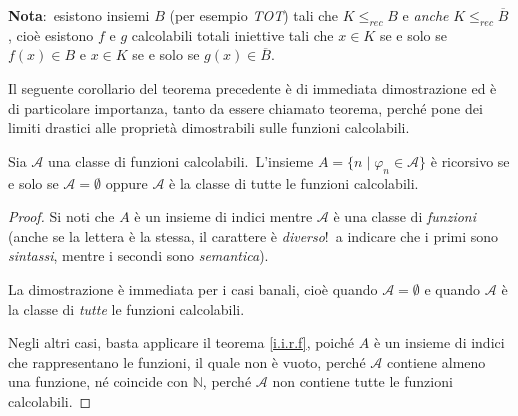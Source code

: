 \noindent\textbf{Nota}:\ esistono insiemi $B$ (per esempio \textit{\footnotesize TOT}) tali che $K \leqslant_{rec} B$ e \textit{anche} $K \leqslant_{rec} \overline{B}$, cioè esistono $f$ e $g$ calcolabili totali iniettive tali che $x \in K$ se e solo se $f(x) \in B$ e $x \in K$ se e solo se $g(x) \in \overline{B}$.\

\vspace{12pt}

\noindent Il seguente corollario del teorema precedente è di immediata dimostrazione ed è di particolare importanza, tanto da essere chiamato teorema, perché pone dei limiti drastici alle proprietà dimostrabili sulle funzioni calcolabili.

\begin{theorem}[Rice]
    Sia $\mathcal{A}$ una classe di funzioni calcolabili.\
    L'insieme $A = \{n \mid \varphi_n \in \mathcal{A}\}$ è ricorsivo se e solo se $\mathcal{A} = \emptyset$ oppure $\mathcal{A}$ è la classe di tutte le funzioni calcolabili.\
\end{theorem}

\begin{proof}
    Si noti che $A$ è un insieme di indici mentre $\mathcal{A}$ è una classe di \textit{funzioni} (anche se la lettera è la stessa, il carattere è \textit{diverso}!\ a indicare che i primi sono \textit{sintassi}, mentre i secondi sono \textit{semantica}).\

    \medskip
    \noindent La dimostrazione è immediata per i casi banali, cioè quando $\mathcal{A} = \emptyset$ e quando $\mathcal{A}$ è la classe di \textit{tutte} le funzioni calcolabili.\

    Negli altri casi, basta applicare il teorema \ref{i.i.r.f}, poiché $A$ è un insieme di indici che rappresentano le funzioni, il quale non è vuoto, perché $\mathcal{A}$ contiene almeno una funzione, né coincide con $\mathbb{N}$, perché $\mathcal{A}$ non contiene tutte le funzioni calcolabili.
\end{proof}

